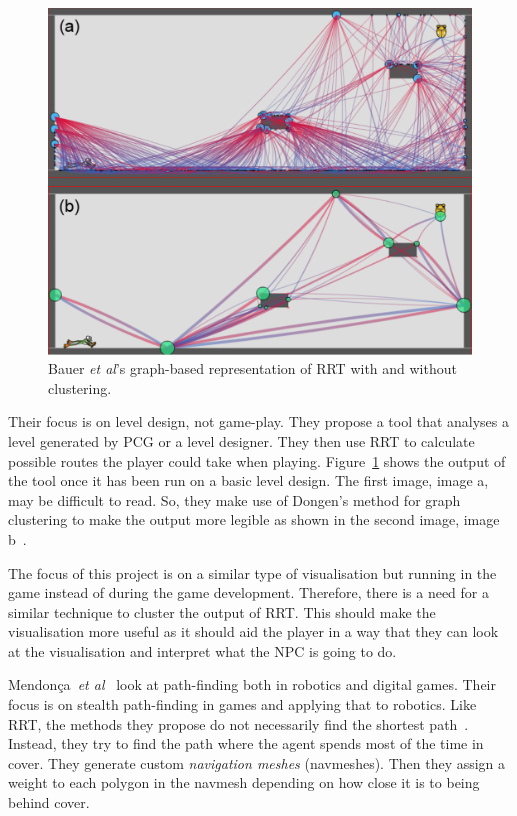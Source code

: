 \documentclass[journal]{IEEEtran}
\begin{document}
\begin{figure}[h]
	\includegraphics[width=1.0\linewidth]{BauerRRT.png}
	\caption{ Bauer \textit{et al}'s\cite{bauer2012} graph-based representation of RRT with and without clustering.}
	\label{BauerRRT}
\end{figure} 

Their focus is on level design, not game-play. They propose a tool that analyses a level generated by PCG or a level designer. They then use RRT to calculate possible routes the player could take when playing.  Figure~\ref{BauerRRT} shows the output of the tool once it has been run on a basic level design.  The first image, image a, may be difficult to read. So, they make use of Dongen's method for graph clustering to make the output more legible as shown in the second image, image b~\cite{bauer2012, Dongen2001}.  

The focus of this project is on a similar type of visualisation but running in the game instead of during the game development. Therefore, there is a need for a similar technique to cluster the output of RRT. This should make the visualisation more useful as it should aid the player in a way that they can look at the visualisation and interpret what the NPC is going to do. 

Mendonça~\textit{et al}~\cite{Mendonça2015} look at path-finding both in robotics and digital games. Their focus is on stealth path-finding in games and applying that to robotics. Like RRT, the methods they propose do not necessarily find the shortest path~\cite{karaman2010, Mendonça2015}. Instead, they try to find the path where the agent spends most of the time in cover. They generate custom \textit{navigation meshes} (navmeshes). Then they assign a weight to each polygon in the navmesh depending on how close it is to being behind cover. 
\end{document}
